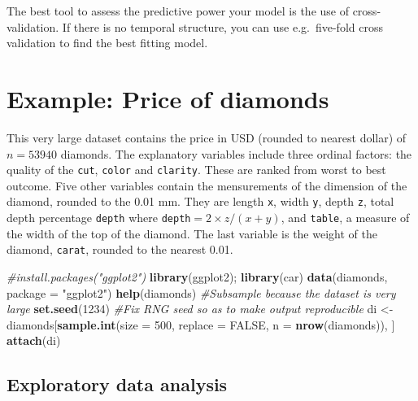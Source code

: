 \documentclass[]{book}
\newenvironment{Shaded}{\begin{snugshade}}{\end{snugshade}}
\newcommand{\CommentTok}[1]{\textcolor[rgb]{0.56,0.35,0.01}{\textit{#1}}}
\newcommand{\DataTypeTok}[1]{\textcolor[rgb]{0.13,0.29,0.53}{#1}}
\newcommand{\DecValTok}[1]{\textcolor[rgb]{0.00,0.00,0.81}{#1}}
\newcommand{\KeywordTok}[1]{\textcolor[rgb]{0.13,0.29,0.53}{\textbf{#1}}}
\newcommand{\NormalTok}[1]{#1}
\newcommand{\OtherTok}[1]{\textcolor[rgb]{0.56,0.35,0.01}{#1}}
\newcommand{\StringTok}[1]{\textcolor[rgb]{0.31,0.60,0.02}{#1}}
\theoremstyle{definition}
\theoremstyle{definition}
\theoremstyle{definition}
\theoremstyle{remark}
\begin{document}
The best tool to assess the predictive power your model is the use of cross-validation. If there is no temporal structure, you can use e.g.~five-fold cross validation to find the best fitting model.

\hypertarget{example-price-of-diamonds}{%
\section{Example: Price of diamonds}\label{example-price-of-diamonds}}

This very large dataset contains the price in USD (rounded to nearest dollar) of \(n=53940\) diamonds. The explanatory variables include three ordinal factors: the quality of the \texttt{cut}, \texttt{color} and \texttt{clarity}. These are ranked from worst to best outcome. Five other variables contain the mensurements of the dimension of the diamond, rounded to the 0.01 mm. They are length \texttt{x}, width \texttt{y}, depth \texttt{z}, total depth percentage \texttt{depth} where \texttt{depth}\(=2\times z/(x + y)\), and \texttt{table}, a measure of the width of the top of the diamond. The last variable is the weight of the diamond, \texttt{carat}, rounded to the nearest 0.01.

\begin{Shaded}
\begin{Highlighting}[]
\CommentTok{#install.packages("ggplot2")}
\KeywordTok{library}\NormalTok{(ggplot2); }\KeywordTok{library}\NormalTok{(car)}
\KeywordTok{data}\NormalTok{(diamonds, }\DataTypeTok{package =} \StringTok{"ggplot2"}\NormalTok{)}
\KeywordTok{help}\NormalTok{(diamonds)}
\CommentTok{#Subsample because the dataset is very large}
\KeywordTok{set.seed}\NormalTok{(}\DecValTok{1234}\NormalTok{) }\CommentTok{#Fix RNG seed so as to make output reproducible}
\NormalTok{di <-}\StringTok{ }\NormalTok{diamonds[}\KeywordTok{sample.int}\NormalTok{(}\DataTypeTok{size =} \DecValTok{500}\NormalTok{, }\DataTypeTok{replace =} \OtherTok{FALSE}\NormalTok{, }\DataTypeTok{n =} \KeywordTok{nrow}\NormalTok{(diamonds)), ]}
\KeywordTok{attach}\NormalTok{(di)}
\end{Highlighting}
\end{Shaded}

\hypertarget{exploratory-data-analysis}{%
\subsection{Exploratory data analysis}\label{exploratory-data-analysis}}
\end{document}
